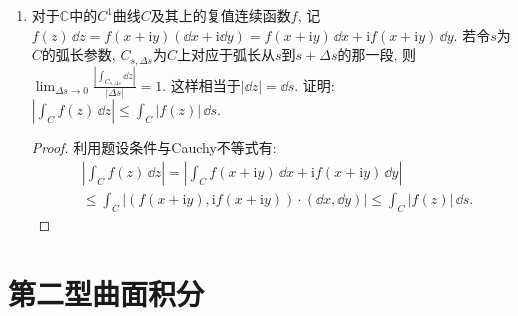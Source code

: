 \begin{quizb}
\begin{enumerate}
\item 对于\(\mathbb{C}\)中的\(C^1\)曲线\(C\)及其上的复值连续函数\(f\), 
记\(f(z)\,\dd z=f(x+\mathrm{i}y)(\dd x+\mathrm{i}\dd y)
=f(x+\mathrm{i}y)\,\dd x+\mathrm{i}f(x+\mathrm{i}y)\,\dd y\). 
若令\(s\)为\(C\)的弧长参数, 
\(C_{s,\Delta s}\)为\(C\)上对应于弧长从\(s\)到\(s+\Delta s\)的那一段, 
则\(\lim_{\Delta s\rightarrow 0}\frac{\left|\int_{C_{s,\Delta s}}\dd z\right|}{|\Delta s|}=1.\)
这样相当于\(|\dd z|=\dd s\). 证明: \(\left|\int_C f(z)\,\dd z\right|\leqslant \int_C|f(z)|\,\dd s\). 
\begin{proof}
利用题设条件与Cauchy不等式有:\[\begin{split}
&\left|\int_Cf(z)\,\dd z\right|
=\left|\int_C f(x+\mathrm{i}y)\,\dd x+\mathrm{i}f(x+\mathrm{i}y)\,\dd y\right|\\
&\leqslant\int_C\left|\left(f(x+\mathrm{i}y),\mathrm{i}f(x+\mathrm{i}y)\right)\cdot (\dd x,\dd y)\right|
\leqslant\int_C|f(z)|\,\dd s.
\end{split}\]
\end{proof}
\end{enumerate}
\end{quizb}

\section{第二型曲面积分}
